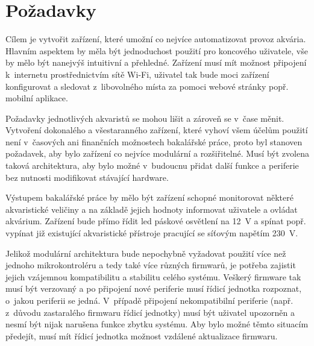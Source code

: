 \section{Požadavky}
\label{sec:pozadavky}
    Cílem je vytvořit zařízení, které umožní co nejvíce automatizovat provoz akvária. Hlavním aspektem by měla být jednoduchost použití pro koncového uživatele, vše by mělo být nanejvýš intuitivní a přehledné. Zařízení musí mít možnost připojení k~internetu prostřednictvím sítě Wi-Fi, uživatel tak bude moci zařízení konfigurovat a sledovat z~libovolného místa za pomoci webové stránky popř. mobilní aplikace.

    Požadavky jednotlivých akvaristů se mohou lišit a zároveň se v~čase měnit. Vytvoření dokonalého a všestaranného zařízení, které vyhoví všem účelům použití není v~časových ani finančních možnostech bakalářské práce, proto byl stanoven požadavek, aby bylo zařízení co nejvíce modulární a rozšiřitelné. Musí být zvolena taková architektura, aby bylo možné v~budoucnu přidat další funkce a periferie bez nutnosti modifikovat stávající hardware.

    Výstupem bakalářské práce by mělo být zařízení schopné monitorovat některé akvaristické veličiny a na základě jejich hodnoty informovat uživatele a ovládat akvárium. Zařízení bude přímo řídit \acs{led} páskové osvětlení na \qty{12}{V} a spínat popř. vypínat již existující akvaristické přístroje pracující se síťovým napětím \qty{230}{V}.  

    Jelikož modulární architektura bude nepochybně vyžadovat použití více než jednoho mikrokontroléru a tedy také více různých firmwarů, je potřeba zajistit jejich vzájemnou kompatibilitu a stabilitu celého systému. Veškerý firmware tak musí být verzovaný a po připojení nové periferie musí řídicí jednotka rozpoznat, o~jakou periferii se jedná. V~případě připojení nekompatibilní periferie (např. z~důvodu zastaralého firmwaru řídicí jednotky) musí být uživatel upozorněn a nesmí být nijak narušena funkce zbytku systému. Aby bylo možné těmto situacím předejít, musí mít řídicí jednotka možnost vzdálené aktualizace firmwaru.